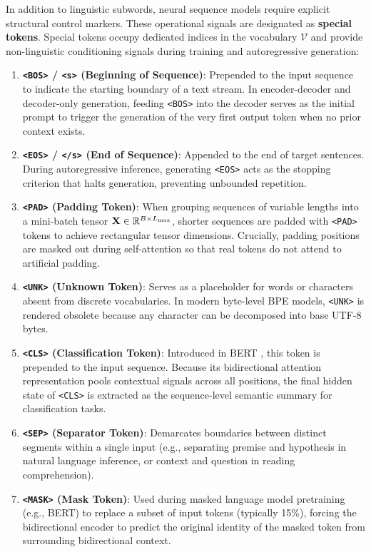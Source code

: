 \documentclass[../../../main.tex]{subfiles}
\begin{document}
In addition to linguistic subwords, neural sequence models require explicit structural control markers. These operational signals are designated as \textbf{special tokens}. Special tokens occupy dedicated indices in the vocabulary $\mathcal{V}$ and provide non-linguistic conditioning signals during training and autoregressive generation:
\begin{enumerate}
    \item \textbf{\texttt{<BOS>} / \texttt{<s>} (Beginning of Sequence)}: Prepended to the input sequence to indicate the starting boundary of a text stream. In encoder-decoder and decoder-only generation, feeding \texttt{<BOS>} into the decoder serves as the initial prompt to trigger the generation of the very first output token when no prior context exists.
    \item \textbf{\texttt{<EOS>} / \texttt{</s>} (End of Sequence)}: Appended to the end of target sentences. During autoregressive inference, generating \texttt{<EOS>} acts as the stopping criterion that halts generation, preventing unbounded repetition.
    \item \textbf{\texttt{<PAD>} (Padding Token)}: When grouping sequences of variable lengths into a mini-batch tensor $\mathbf{X} \in \mathbb{R}^{B \times L_{\max}}$, shorter sequences are padded with \texttt{<PAD>} tokens to achieve rectangular tensor dimensions. Crucially, padding positions are masked out during self-attention so that real tokens do not attend to artificial padding.
    \item \textbf{\texttt{<UNK>} (Unknown Token)}: Serves as a placeholder for words or characters absent from discrete vocabularies. In modern byte-level BPE models, \texttt{<UNK>} is rendered obsolete because any character can be decomposed into base UTF-8 bytes.
    \item \textbf{\texttt{<CLS>} (Classification Token)}: Introduced in BERT \cite{devlin2019}, this token is prepended to the input sequence. Because its bidirectional attention representation pools contextual signals across all positions, the final hidden state of \texttt{<CLS>} is extracted as the sequence-level semantic summary for classification tasks.
    \item \textbf{\texttt{<SEP>} (Separator Token)}: Demarcates boundaries between distinct segments within a single input (e.g., separating premise and hypothesis in natural language inference, or context and question in reading comprehension).
    \item \textbf{\texttt{<MASK>} (Mask Token)}: Used during masked language model pretraining (e.g., BERT) to replace a subset of input tokens (typically 15\%), forcing the bidirectional encoder to predict the original identity of the masked token from surrounding bidirectional context.
\end{enumerate}
\end{document}
